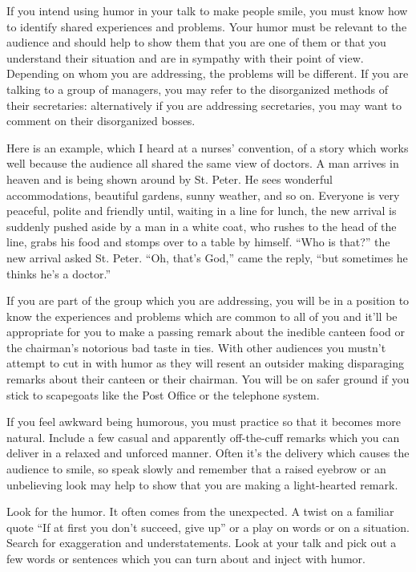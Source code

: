 \documentclass[UTF8,11pt]{ctexart}
\begin{document}
If you intend using humor in your talk to make people smile, you must know how to identify shared experiences and problems. Your humor must be relevant to the audience and should help to show them that you are one of them or that you understand their situation and are in sympathy with their point of view. Depending on whom you are addressing, the problems will be different. If you are talking to a group of managers, you may refer to the disorganized methods of their secretaries: alternatively if you are addressing secretaries, you may want to comment on their disorganized bosses.


Here is an example, which I heard at a nurses’ convention, of a story which works well because the audience all shared the same view of doctors. A man arrives in heaven and is being shown around by St. Peter. He sees wonderful accommodations, beautiful gardens, sunny weather, and so on. Everyone is very peaceful, polite and friendly until, waiting in a line for lunch, the new arrival is suddenly pushed aside by a man in a white coat, who rushes to the head of the line, grabs his food and stomps over to a table by himself. “Who is that?” the new arrival asked St. Peter. “Oh, that’s God,” came the reply, “but sometimes he thinks he’s a doctor.”


If you are part of the group which you are addressing, you will be in a position to know the experiences and problems which are common to all of you and it’ll be appropriate for you to make a passing remark about the inedible canteen food or the chairman’s notorious bad taste in ties. With other audiences you mustn’t attempt to cut in with humor as they will resent an outsider making disparaging remarks about their canteen or their chairman. You will be on safer ground if you stick to scapegoats like the Post Office or the telephone system.


If you feel awkward being humorous, you must practice so that it becomes more natural. Include a few casual and apparently off-the-cuff remarks which you can deliver in a relaxed and unforced manner. Often it’s the delivery which causes the audience to smile, so speak slowly and remember that a raised eyebrow or an unbelieving look may help to show that you are making a light-hearted remark.


Look for the humor. It often comes from the unexpected. A twist on a familiar quote “If at first you don’t succeed, give up” or a play on words or on a situation. Search for exaggeration and understatements. Look at your talk and pick out a few words or sentences which you can turn about and inject with humor.
\end{document}
